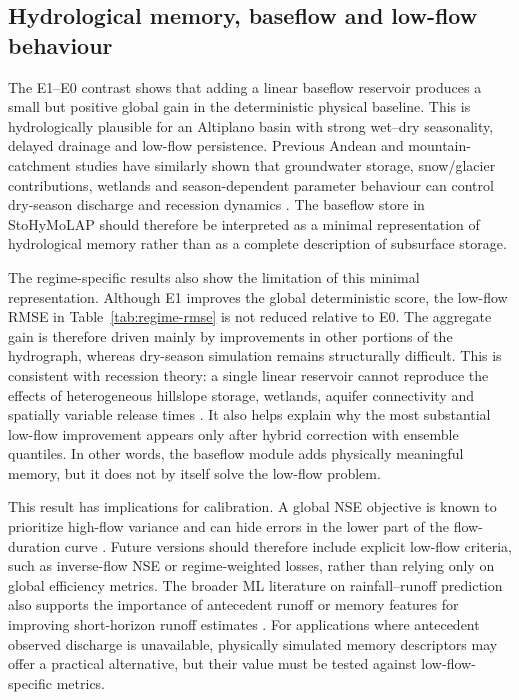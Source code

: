 \documentclass[a4paper,fleqn]{cas-sc}
\begin{document}
\subsection{Hydrological memory, baseflow and low-flow behaviour}
\label{subsec:discussion-baseflow}

The E1--E0 contrast shows that adding a linear baseflow reservoir
produces a small but positive global gain in the deterministic physical
baseline. This is hydrologically plausible for an Altiplano basin with
strong wet--dry seasonality, delayed drainage and low-flow persistence.
Previous Andean and mountain-catchment studies have similarly shown
that groundwater storage, snow/glacier contributions, wetlands and
season-dependent parameter behaviour can control dry-season discharge
and recession dynamics \citep{nauditt2017conceptual,ragettli2014evaluation,condom2004transient,lima2025modeling}. The baseflow store in
StoHyMoLAP should therefore be interpreted as a minimal representation
of hydrological memory rather than as a complete description of
subsurface storage.

The regime-specific results also show the limitation of this minimal
representation. Although E1 improves the global deterministic score, the
low-flow RMSE in Table~\ref{tab:regime-rmse} is not reduced relative to
E0. The aggregate gain is therefore driven mainly by improvements in
other portions of the hydrograph, whereas dry-season simulation remains
structurally difficult. This is consistent with recession theory: a
single linear reservoir cannot reproduce the effects of heterogeneous
hillslope storage, wetlands, aquifer connectivity and spatially variable
release times \citep{harman2009power,van2013influence}. It also helps
explain why the most substantial low-flow improvement appears only after
hybrid correction with ensemble quantiles. In other words, the baseflow
module adds physically meaningful memory, but it does not by itself
solve the low-flow problem.

This result has implications for calibration. A global NSE objective is
known to prioritize high-flow variance and can hide errors in the lower
part of the flow-duration curve \citep{pushpalatha2012review}. Future
versions should therefore include explicit low-flow criteria, such as
inverse-flow NSE or regime-weighted losses, rather than relying only on
global efficiency metrics. The broader ML literature on rainfall--runoff
prediction also supports the importance of antecedent runoff or memory
features for improving short-horizon runoff estimates
\citep{adnan2021comparison,okkan2021embedding}. For applications where
antecedent observed discharge is unavailable, physically simulated
memory descriptors may offer a practical alternative, but their value
must be tested against low-flow-specific metrics.
\end{document}
